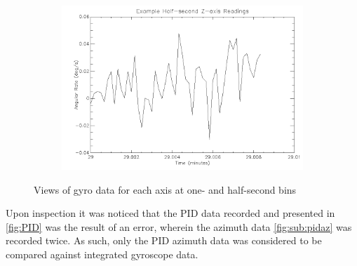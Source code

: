 {\begin{figure}[htbp]
\begin{subfigure}{0.45\textwidth}
		\caption{}
		\label{fig:sub:gyroz1}
	\end{subfigure}
	\begin{subfigure}{0.45\textwidth}
		\includegraphics[width=1\linewidth]{appendix/img/campaign_results/gyrozhalfsec.png}
		\caption{}
		\label{fig:sub:gyrozh}
	\end{subfigure}
	\caption{Views of gyro data for each axis at one- and half-second bins}
	\label{fig:gyrodetail}
\end{figure}

Upon inspection it was noticed that the PID data recorded and presented in \ref{fig:PID} was the result of an error, wherein the azimuth data \ref{fig:sub:pidaz} was recorded twice. As such, only the PID azimuth data was considered to be compared against integrated gyroscope data.

}
